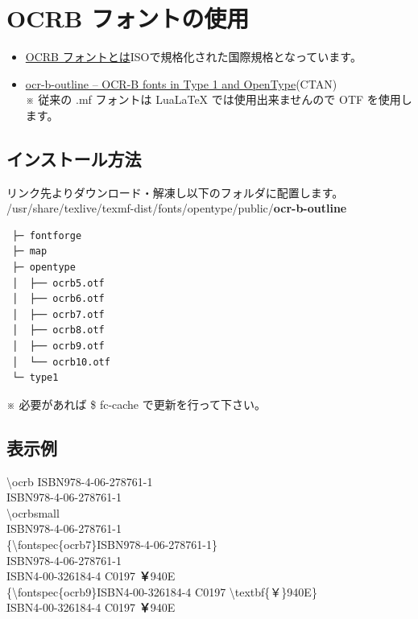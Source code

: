 \documentclass[a5j,tombo,10pt,titlepage,pdfusetitle]{ltjsbook}
\def\ocrb#1{\fontspec{ocrb7} {#1}}
\def\ocrbsmall#1{\fontspec{ocrb7} \fontsize{7}{7}{#1}\selectfont }
\def\fs#1#2{\fontsize{#1}{#2}\selectfont }
\begin{document}
{\newpage
\thispagestyle{empty}

\section{OCRB フォントの使用}
\begin{itemize}
  \item \href{https://imagers.co.jp/contents/1537/}{OCRB フォントとは}ISOで規格化された国際規格となっています。
  \item \href{https://ctan.org/pkg/ocr-b-outline}{ocr-b-outline – OCR-B fonts in Type 1 and OpenType}(CTAN)\\
{\fs{9}{9} ※ 従来の .mf フォントは LuaLaTeX では使用出来ませんので OTF を使用します。}
\end{itemize}

\subsection{インストール方法}
\noindent リンク先よりダウンロード・解凍し以下のフォルダに配置します。\\
/usr/share/texlive/texmf-dist/fonts/opentype/public/\textbf{ocr-b-outline}\vspace{-2mm}\\
{\fs{8}{6}
\begin{verbatim}
 ├─ fontforge
 ├─ map
 ├─ opentype
 │  ├── ocrb5.otf
 │  ├── ocrb6.otf
 │  ├── ocrb7.otf
 │  ├── ocrb8.otf
 │  ├── ocrb9.otf
 │  └── ocrb10.otf
 └─ type1
\end{verbatim}\vspace{-5mm}
 ※ 必要があれば \$ fc-cache で更新を行って下さい。}\vspace{-2mm}

\subsection{表示例}\vspace{-2mm}

\noindent\quad\textbackslash ocrb ISBN978-4-06-278761-1\\
{\ocrb\quad ISBN978-4-06-278761-1}\\
\quad\textbackslash ocrbsmall\\
{\ocrbsmall\quad ISBN978-4-06-278761-1}\vspace{-6mm}\\

\noindent \{\textbackslash fontspec\{ocrb7\}ISBN978-4-06-278761-1\}\\
{ISBN978-4-06-278761-1}\\
{ISBN4-00-326184-4 C0197 \textbf{￥}940E}\\
\noindent \{\textbackslash fontspec\{ocrb9\}ISBN4-00-326184-4 C0197 \textbackslash textbf\{￥\}940E\}\\
{ISBN4-00-326184-4 C0197 \textbf{￥}940E}\\

}
\end{document}
